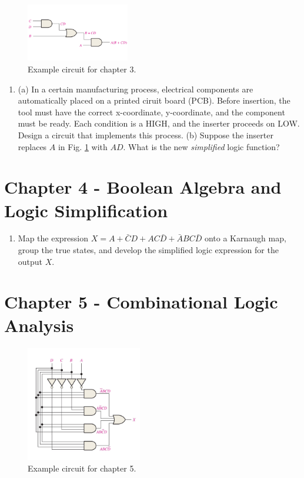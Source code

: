\documentclass[10pt]{article}
\begin{document}
\begin{figure}
\centering
\includegraphics[width=0.4\textwidth,trim=0cm 3cm 0cm 3cm,clip=true]{figures/final1.pdf}
\caption{\label{fig:final1} Example circuit for chapter 3.}
\end{figure}

\begin{enumerate}
\item (a) In a certain manufacturing process, electrical components are automatically placed on a printed ciruit board (PCB).  Before insertion, the tool must have the correct x-coordinate, y-coordinate, and the component must be ready.  Each condition is a HIGH, and the inserter proceeds on LOW.  Design a circuit that implements this process. (b) Suppose the inserter replaces $A$ in Fig. \ref{fig:final1} with $AD$.  What is the new \textit{simplified} logic function?  \\ \vspace{1cm}
\end{enumerate}

\section{Chapter 4 - Boolean Algebra and Logic Simplification}

\begin{enumerate}
\item Map the expression $X = A + \bar{C}D + AC\bar{D} + \bar{A}BC\bar{D}$ onto a Karnaugh map, group the true states, and develop the simplified logic expression for the output $X$. \\ \vspace{2cm}
\end{enumerate}

\section{Chapter 5 - Combinational Logic Analysis}

\begin{figure}
\centering
\includegraphics[width=0.45\textwidth]{figures/final2.pdf}
\caption{\label{fig:final2} Example circuit for chapter 5.}
\end{figure}
\end{document}
